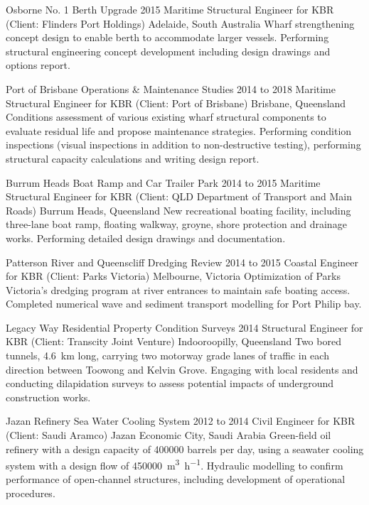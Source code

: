 	\entrytableproject%
	{Osborne No. 1 Berth Upgrade}
	{2015}
	{}
	{Maritime Structural Engineer for KBR (Client: Flinders Port Holdings)}
	{Adelaide, South Australia}
	{Wharf strengthening concept design to enable berth to accommodate larger vessels.}
	{Performing structural engineering concept development including design drawings and options report.}

	\entrytableproject%
	{Port of Brisbane Operations \& Maintenance Studies}
	{2014 to 2018}
	{}
	{Maritime Structural Engineer for KBR (Client: Port of Brisbane)}
	{Brisbane, Queensland}
	{Conditions assessment of various existing wharf structural components to evaluate residual life and propose maintenance strategies.}
	{Performing condition inspections (visual inspections in addition to non-destructive testing), performing structural capacity calculations and writing design report.}

	\entrytableproject%
	{Burrum Heads Boat Ramp and Car Trailer Park}
	{2014 to 2015}
	{}
	{Maritime Structural Engineer for KBR (Client: QLD Department of Transport and Main Roads)}
	{Burrum Heads, Queensland}
	{New recreational boating facility, including three-lane boat ramp, floating walkway, groyne, shore protection and drainage works.}
	{Performing detailed design drawings and documentation.}

	\entrytableproject%
	{Patterson River and Queenscliff Dredging Review}
	{2014 to 2015}
	{}
	{Coastal Engineer for KBR (Client: Parks Victoria)}
	{Melbourne, Victoria}
	{Optimization of Parks Victoria's dredging program at river entrances to maintain safe boating access.}
	{Completed numerical wave and sediment transport modelling for Port Philip bay.}

	\entrytableproject%
	{Legacy Way Residential Property Condition Surveys}
	{2014}
	{}
	{Structural Engineer for KBR (Client: Transcity Joint Venture)}
	{Indooroopilly, Queensland}
	{Two bored tunnels, \SI{4.6}{\km} long, carrying two motorway grade lanes of traffic in each direction between Toowong and Kelvin Grove.}
	{Engaging with local residents and conducting dilapidation surveys to assess potential impacts of underground construction works.}

	\entrytableproject%
	{Jazan Refinery Sea Water Cooling System}
	{2012 to 2014}
	{}
	{Civil Engineer for KBR (Client: Saudi Aramco)}
	{Jazan Economic City, Saudi Arabia}
	{Green-field oil refinery with a design capacity of \num{400000} barrels per day, using a seawater cooling system with a design flow of \SI{450000}{\m\cubed\per\hour}.}
	{Hydraulic modelling to confirm performance of open-channel structures, including development of operational procedures.}

